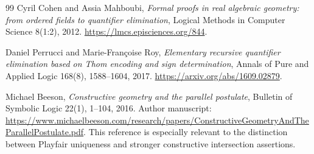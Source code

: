 \begin{thebibliography}{99}
 Cyril Cohen and Assia Mahboubi,
\emph{Formal proofs in real algebraic geometry: from ordered fields to
quantifier elimination}, Logical Methods in Computer Science 8(1:2), 2012.
\url{https://lmcs.episciences.org/844}.

 Daniel Perrucci and Marie-Fran\c{c}oise Roy,
\emph{Elementary recursive quantifier elimination based on Thom encoding
and sign determination}, Annals of Pure and Applied Logic 168(8),
1588--1604, 2017. \url{https://arxiv.org/abs/1609.02879}.

 Michael Beeson,
\emph{Constructive geometry and the parallel postulate},
Bulletin of Symbolic Logic 22(1), 1--104, 2016.
Author manuscript:
\url{https://www.michaelbeeson.com/research/papers/ConstructiveGeometryAndTheParallelPostulate.pdf}.
This reference is especially relevant to the distinction between
Playfair uniqueness and stronger constructive intersection assertions.
\end{thebibliography}
